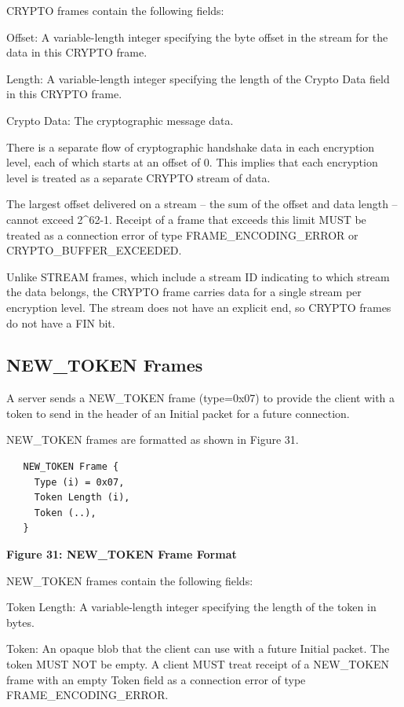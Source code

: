 \documentclass{article}
\begin{document}
CRYPTO frames contain the following fields:

Offset:  A variable-length integer specifying the byte offset in the stream for the data in this CRYPTO frame.

Length:  A variable-length integer specifying the length of the Crypto Data field in this CRYPTO frame.

Crypto Data:  The cryptographic message data.

There is a separate flow of cryptographic handshake data in each encryption level, each of which starts at an offset of 0.  This implies that each encryption level is treated as a separate CRYPTO stream of data.

The largest offset delivered on a stream -- the sum of the offset and data length -- cannot exceed 2\textasciicircum{}62-1.  Receipt of a frame that exceeds this limit MUST be treated as a connection error of type FRAME\_ENCODING\_ERROR or CRYPTO\_BUFFER\_EXCEEDED.

Unlike STREAM frames, which include a stream ID indicating to which stream the data belongs, the CRYPTO frame carries data for a single stream per encryption level.  The stream does not have an explicit end, so CRYPTO frames do not have a FIN bit.

\subsection{NEW\_TOKEN Frames}

A server sends a NEW\_TOKEN frame (type=0x07) to provide the client with a token to send in the header of an Initial packet for a future connection.

NEW\_TOKEN frames are formatted as shown in Figure 31.

\begin{verbatim}
   NEW_TOKEN Frame {
     Type (i) = 0x07,
     Token Length (i),
     Token (..),
   }
\end{verbatim}

\begin{center}
\textbf{Figure 31: NEW\_TOKEN Frame Format}
\end{center}

NEW\_TOKEN frames contain the following fields:

Token Length:  A variable-length integer specifying the length of the token in bytes.

Token:  An opaque blob that the client can use with a future Initial packet.  The token MUST NOT be empty.  A client MUST treat receipt of a NEW\_TOKEN frame with an empty Token field as a connection error of type FRAME\_ENCODING\_ERROR.
\end{document}
